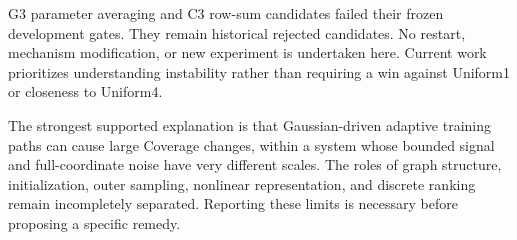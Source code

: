 G3 parameter averaging and C3 row-sum candidates failed their frozen development gates. They remain historical rejected candidates. No restart, mechanism modification, or new experiment is undertaken here. Current work prioritizes understanding instability rather than requiring a win against Uniform1 or closeness to Uniform4.

The strongest supported explanation is that Gaussian-driven adaptive training paths can cause large Coverage changes, within a system whose bounded signal and full-coordinate noise have very different scales. The roles of graph structure, initialization, outer sampling, nonlinear representation, and discrete ranking remain incompletely separated. Reporting these limits is necessary before proposing a specific remedy.
